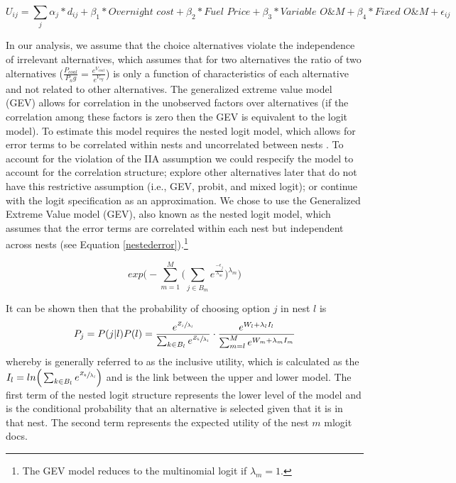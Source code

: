 \documentclass[10pt]{amsart}
\begin{document}
\begin{equation}\label{mlogit.spec}
U_{ij} = \sum_j \alpha_{j}*d_{ij} + \beta_1*\textit{Overnight cost} + \beta_2*\textit{Fuel Price} + \beta_3*\textit{Variable O\&M} + \beta_4*\textit{Fixed O\&M} + \epsilon_{ij}
\end{equation} 
 
In our analysis, we assume that the choice alternatives violate the independence of irrelevant alternatives, which assumes that for two alternatives the ratio of two alternatives ($\frac{P_{coal}}{P_ng} = \frac{e^{V_{coal}}}{e^{V_{ng}}}$) is only a function of characteristics of each alternative and not related to other alternatives. 
The generalized extreme value model (GEV) allows for correlation in the unobserved factors over alternatives (if the correlation among these factors is zero then the GEV is equivalent to the logit model). 
To estimate this model requires the nested logit model, which allows for error terms to be correlated within nests and uncorrelated between nests \parencite{mcfadden1978}.
To account for the violation of the IIA assumption we could respecify the model to account for the correlation structure; explore other alternatives later that do not have this restrictive assumption (i.e., GEV, probit, and mixed logit); or continue with the logit specification as an approximation.
We chose to use the Generalized Extreme Value model (GEV), also known as the nested logit model, which assumes that the error terms are correlated within each nest but independent across nests (see Equation \ref{nestederror}).\footnote{The GEV model reduces to the multinomial logit if $\lambda_m = 1$.}

\begin{equation}\label{nestederror}
exp\Big(- \sum_{m=1}^{M} \Big(\sum_{j\in B_m} e^{\frac{-\epsilon_j}{\lambda_m}} \Big)^{\lambda_m} \Big)
\end{equation} 

It can be shown then that the probability of choosing option $j$ in nest $l$ is 
\begin{equation}\label{nestedstructure}
P_j = P(j | l)P(l) = \frac{e^{\sfrac{{Z_j}}{\lambda_l}}}{\sum_{k\in B_l}e^{\sfrac{Z_k}{\lambda_l}}} \cdot \frac{e^{W_l+\lambda_l I_l}}{\sum_{m=l}^M e^{W_m+\lambda_m I_m}}
\end{equation}
whereby is generally referred to as the inclusive utility, which is calculated as the $I_l = ln\Big(\sum_{k\in B_l} e^{\sfrac{Z_k}{\lambda_l}}\Big)$ and is the link between the upper and lower model. 
The first term of the nested logit structure represents the lower level of the model and is the conditional probability that an alternative is selected given that it is in that nest. 
The second term represents the expected utility of the nest $m$ \parencite{} mlogit docs.
\end{document}
